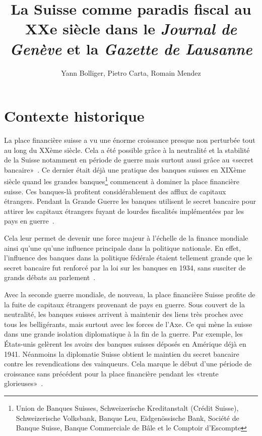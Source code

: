 \documentclass[11pt]{article}
\title{La Suisse comme paradis fiscal au XXe siècle dans le
\textit{Journal de Genève} et la \textit{Gazette de Lausanne}}
\author{Yann Bolliger, Pietro Carta, Romain Mendez}
\begin{document}
\maketitle

\section{Contexte historique}

La place financière suisse a vu une énorme croissance presque non perturbée tout
au long du XXème siècle. Cela a été possible grâce à la neutralité et la
stabilité de la Suisse notamment en période de guerre mais surtout aussi grâce
au «secret bancaire»~\citep[p. 512]{Mazbouri12}. Ce dernier
était déjà une pratique des banques suisses en XIXème siècle quand les grandes
banques\footnote{Union de Banques Suisses, Schweizerische Kreditanstalt (Crédit
Suisse), Schweizerische Volksbank, Banque Leu, Eidgenössische Bank, Société de
Banque Suisse, Banque Commerciale de Bâle et le Comptoir d’Escompte} commencent
à dominer la place financière suisse. Ces banques-là profitent considérablement
des afflux de capitaux étrangers. Pendant la Grande Guerre les banques utilisent
le secret bancaire pour attirer les capitaux étrangers fuyant de lourdes
fiscalités implémentées par les pays en guerre~\citep[p. 484-486]{Mazbouri12}.

Cela leur permet de devenir une force majeur à l’échelle de la finance mondiale
ainsi qu’une qu’une influence principale dans la politique nationale. En effet,
l’influence des banques dans la politique fédérale étaient tellement grande que
le secret bancaire fut renforcé par la loi sur les banques en 1934, sans
susciter de grands débats au parlement~\citep{Guex99}. 

Avec la seconde guerre mondiale, de nouveau, la place financière Suisse profite
de la fuite de capitaux étrangers provenant de pays en guerre. Sous couvert de
la neutralité, les banques suisses arrivent à maintenir des liens très proches
avec tous les belligérants, mais surtout avec les forces de l’Axe. Ce qui mène
la suisse dans une grande isolation diplomatique à la fin de la guerre. Par
exemple, les États-unis gelèrent les avoirs des banques suisses déposés en
Amérique déjà en 1941. Néanmoins la diplomatie Suisse obtient le maintien du
secret bancaire contre les revendications des vainqueurs. Cela marque le début
d’une période de croissance sans précédent pour la place financière pendant les
«trente glorieuses»~\citep[p. 495]{Mazbouri12}.
\end{document}
